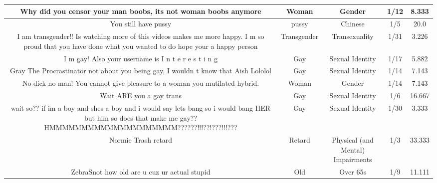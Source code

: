 \documentclass[11pt]{article}
\newlength\mylength
\begin{document}
\begin{center}
\begin{longtable}{|C{.40\mylength}|C{.30\mylength}|C{.15\mylength}|C{.15\mylength}|C{.15\mylength}|}
  Why did you censor your man boobs, its not woman boobs anymore  & Woman & Gender & 1/12 & 8.333 \\  \hline
  You still have pussy    & pussy & Chinese & 1/5 & 20.0 \\  \hline
  I am transgender!! Is watching more of this videos makes me more happy. I m so proud that you have done what you wanted to do  hope your a happy person    & Transgender & Transexuality & 1/31 & 3.226 \\  \hline
  I m gay! Also your username is I n t e r e s t i n g  & Gay & Sexual Identity & 1/17 & 5.882 \\  \hline
  Gray The Procrastinator not about you being gay, I wouldn t know that Aish Lololol  & Gay & Sexual Identity & 1/14 & 7.143 \\  \hline
  No dick no man! You cannot give pleasure to a woman you mutilated hybrid.  & Woman & Gender & 1/14 & 7.143 \\  \hline
  Wait ARE you a gay trans  & Gay & Sexual Identity & 1/6 & 16.667 \\  \hline
  wait so?? if im a boy and shes a boy and i would say lets bang so i would bang  HER  but  him  so does that make me gay?? HMMMMMMMMMMMMMMMMMMMM??????!!!??!???!!!???  & Gay & Sexual Identity & 1/30 & 3.333 \\  \hline
  Normie Trash retard  & Retard & Physical (and Mental) Impairments & 1/3 & 33.333 \\  \hline
   ZebraSnot how old are u cuz ur actual stupid  & Old & Over 65s & 1/9 & 11.111 \\  \hline

\end{longtable}
\end{center}
\end{document}

